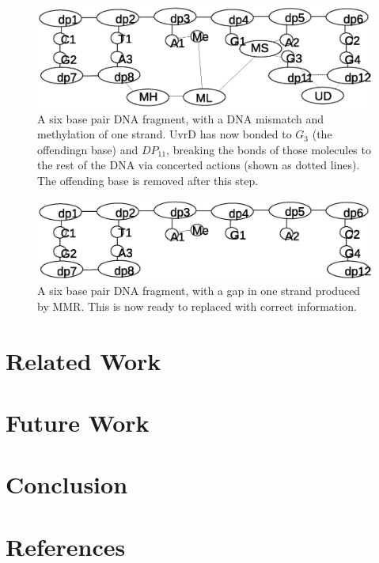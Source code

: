 \documentclass[review]{elsarticle}
\begin{document}
\begin{figure}[h!]
  \centering
    \includegraphics[width=1.0\textwidth]{mmr/state6}
  \caption[A six base pair DNA fragment.]{A six base pair DNA fragment, with a DNA mismatch and methylation of one strand. UvrD has now bonded to $G_3$ (the offendingn base) and $DP_{11}$, breaking the bonds of those molecules to the rest of the DNA via concerted actions (shown as dotted lines). The offending base is removed after this step.}
  \label{fig:state6}
\end{figure}

\begin{figure}[h!]
  \centering
    \includegraphics[width=1.0\textwidth]{mmr/state7}
  \caption[A six base pair DNA fragment.]{A six base pair DNA fragment, with a gap in one strand produced by MMR. This is now ready to replaced with correct information.}
  \label{fig:state7}
\end{figure}


\section{Related Work}

\section{Future Work}

\section{Conclusion}

\section*{References}


\end{document}
